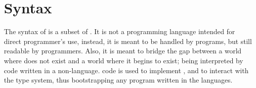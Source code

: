 
\chapter{Syntax}
\label{ch:aml-bootstrap-syntax}

The syntax of \AmlBootstrap is a subset of \AmlBase. It is not a programming language intended for direct programmer's use, instead, it is meant to be handled by programs, but still readable by programmers. Also, it is meant to bridge the gap between a world where \Aml does not exist and a world where it begins to exist; being interpreted by code written in a non-\Aml language. \AmlBootstrap code is used to implement \AmlBase, and to interact with the type system, thus bootstrapping any program written in the \Aml languages.



